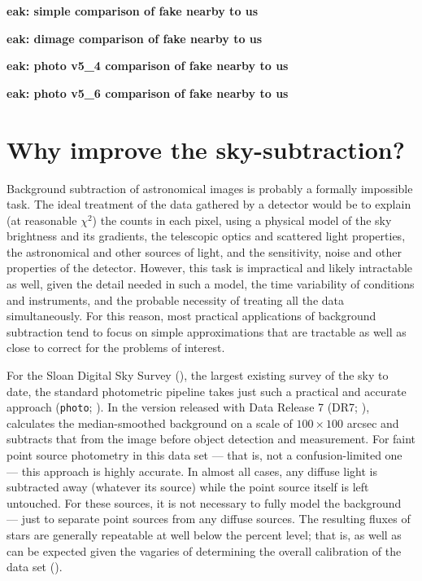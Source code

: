 \documentclass[10pt,preprint]{aastex}
\begin{document}
{\bf eak: simple comparison of fake nearby to us}

{\bf eak: dimage comparison of fake nearby to us}

{\bf eak: photo v5\_4 comparison of fake nearby to us}

{\bf eak: photo v5\_6 comparison of fake nearby to us}

\section{ Why improve the sky-subtraction?}
\label{sec:intro}

Background subtraction of astronomical images is probably a formally
impossible task.  The ideal treatment of the data gathered by a
detector would be to explain (at reasonable $\chi^2$) the counts in
each pixel, using a physical model of the sky brightness and its
gradients, the telescopic optics and scattered light properties, the
astronomical and other sources of light, and the sensitivity, noise
and other properties of the detector. 
However, this task is impractical and likely intractable as well,
given the detail needed in such a model, the time variability of
conditions and instruments, and the probable necessity of treating all
the data simultaneously. For this reason, most practical applications
of background subtraction tend to focus on simple approximations that
are tractable as well as close to correct for the problems of
interest.

For the Sloan Digital Sky Survey (\citealt{york00a}), the largest
existing survey of the sky to date, the standard photometric pipeline
takes just such a practical and accurate approach ({\tt photo};
\citealt{lupton01a}). In the version released with Data Release 7
(DR7; \citealt{abazajian09a}), calculates the median-smoothed
background on a scale of $100\times100$ arcsec and subtracts that from
the image before object detection and measurement. For faint point
source photometry in this data set --- that is, not a
confusion-limited one --- this approach is highly accurate. In almost
all cases, any diffuse light is subtracted away (whatever its source)
while the point source itself is left untouched. For these sources, it
is not necessary to fully model the background --- just to separate
point sources from any diffuse sources. The resulting fluxes of stars
are generally repeatable at well below the percent level; that is, as
well as can be expected given the vagaries of determining the overall
calibration of the data set (\citealt{padmanabhan07a}).
\end{document}
